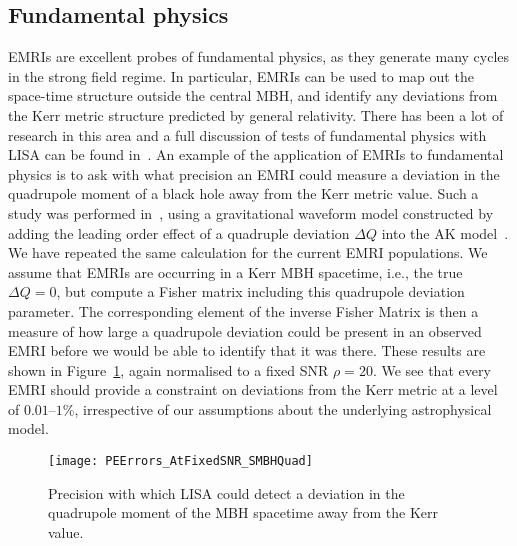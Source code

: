 \documentclass[a4paper]{jpconf}
\begin{document}
\subsection{Fundamental physics}
EMRIs are excellent probes of fundamental physics, as they generate many cycles in the strong field regime. In particular, EMRIs can be used to map out the space-time structure outside the central MBH, and identify any deviations from the Kerr metric structure predicted by general relativity. There has been a lot of research in this area and a full discussion of tests of fundamental physics with LISA can be found in~\cite{TestGRLivRev}. An example of the application of EMRIs to fundamental physics is to ask with what precision an EMRI could measure a deviation in the quadrupole moment of a black hole away from the Kerr metric value. Such a study was performed in~\cite{AKBumpy}, using a gravitational waveform model constructed by adding the leading order effect of a quadruple deviation $\Delta Q$ into the AK model~\cite{AK}. We have repeated the same calculation for the current EMRI populations. We assume that EMRIs are occurring in a Kerr MBH spacetime, i.e., the true $\Delta Q = 0$, but compute a Fisher matrix including this quadrupole deviation parameter. The corresponding element of the inverse Fisher Matrix is then a measure of how large a quadrupole deviation could be present in an observed EMRI before we would be able to identify that it was there. These results are shown in Figure~\ref{fig:SMBHquad}, again normalised to a fixed SNR $\rho=20$. We see that every EMRI should provide a constraint on deviations from the Kerr metric at a level of $0.01$--$1\%$, irrespective of our assumptions about the underlying astrophysical model.

\begin{figure}
\begin{center}
\texttt{[image: PEErrors\_AtFixedSNR\_SMBHQuad]}
\end{center}
\caption{\label{fig:SMBHquad}Precision with which LISA could detect a deviation in the quadrupole moment of the MBH spacetime away from the Kerr value.}
\end{figure}
\end{document}
